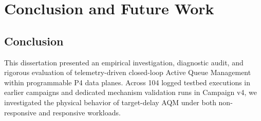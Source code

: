 \documentclass[12pt,a4paper,oneside]{report}
\begin{document}
\chapter{Conclusion and Future Work}
\label{ch:conclusion}

\section{Conclusion}
This dissertation presented an empirical investigation, diagnostic audit, and rigorous evaluation of telemetry-driven closed-loop Active Queue Management within programmable P4 data planes. Across 104 logged testbed executions in earlier campaigns and dedicated mechanism validation runs in Campaign v4, we investigated the physical behavior of target-delay AQM under both non-responsive and responsive workloads.
\end{document}
